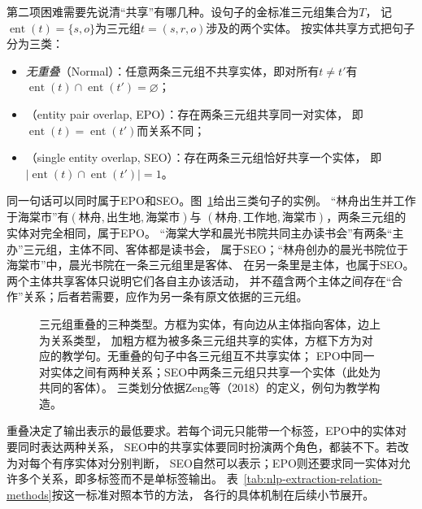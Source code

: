 第二项困难需要先说清“共享”有哪几种。设句子的金标准三元组集合为$T$，
记$\operatorname{ent}(t)=\{s,o\}$为三元组$t=(s,r,o)$涉及的两个实体。
\citeauthor{zeng2018copyre}按实体共享方式把句子分为三类\cite{zeng2018copyre}：
\begin{itemize}
  \item \emph{无重叠}（Normal）：任意两条三元组不共享实体，即对所有$t\neq t'$有
    $\operatorname{ent}(t)\cap\operatorname{ent}(t')=\varnothing$；
  \item {}（entity pair overlap, EPO）：存在两条三元组共享同一对实体，
    即$\operatorname{ent}(t)=\operatorname{ent}(t')$而关系不同；
  \item {}（single entity overlap, SEO）：存在两条三元组恰好共享一个实体，
    即$|\operatorname{ent}(t)\cap\operatorname{ent}(t')|=1$。
\end{itemize}
同一句话可以同时属于EPO和SEO。图~\ref{fig:nlp-extraction-overlap}给出三类句子的实例。
“林舟出生并工作于海棠市”有$(\text{林舟},\text{出生地},\text{海棠市})$与
$(\text{林舟},\text{工作地},\text{海棠市})$，两条三元组的实体对完全相同，属于EPO。
“海棠大学和晨光书院共同主办读书会”有两条“主办”三元组，主体不同、客体都是读书会，
属于SEO；“林舟创办的晨光书院位于海棠市”中，晨光书院在一条三元组里是客体、
在另一条里是主体，也属于SEO。两个主体共享客体只说明它们各自主办该活动，
并不蕴含两个主体之间存在“合作”关系；后者若需要，应作为另一条有原文依据的三元组。

\begin{figure}[htbp]
  \centering
  
  \caption{三元组重叠的三种类型。方框为实体，有向边从主体指向客体，边上为关系类型，
  加粗方框为被多条三元组共享的实体，方框下方为对应的教学句。无重叠的句子中各三元组互不共享实体；
  EPO中同一对实体之间有两种关系；SEO中两条三元组只共享一个实体（此处为共同的客体）。
  三类划分依据Zeng等（2018）的定义，例句为教学构造。}
  \label{fig:nlp-extraction-overlap}
\end{figure}

重叠决定了输出表示的最低要求。若每个词元只能带一个标签，EPO中的实体对要同时表达两种关系，
SEO中的共享实体要同时扮演两个角色，都装不下。若改为对每个有序实体对分别判断，
SEO自然可以表示；EPO则还要求同一实体对允许多个关系，即多标签而不是单标签输出。
表~\ref{tab:nlp-extraction-relation-methods}按这一标准对照本节的方法，
各行的具体机制在后续小节展开。

